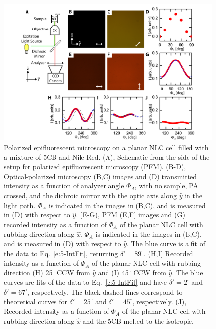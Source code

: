 \begin{figure}
  \centering
  \includegraphics{figures/C5/Ch5-Figs_PFM_FlatCell.png}
  \caption{Polarized epifluorescent microscopy on a planar NLC cell filled with a mixture of 5CB and Nile Red.
  (A), Schematic from the side of the setup for polarized epifluorescent microscopy (PFM).
  (B-D), Optical-polarized microscopy (B,C) images and (D) transmitted intensity as a function of analyzer angle $\Phi_A$, with no sample, PA crossed, and the dichroic mirror with the optic axis along $\hat{y}$ in the light path.
  $\Phi_A$ is indicated in the images in (B,C), and is measured in (D) with respect to $\hat{y}$.
  (E-G), PFM (E,F) images and (G) recorded intensity as a function of $\Phi_A$ of the planar NLC cell with rubbing direction along $\hat{x}$.
  $\Phi_A$ is indicated in the images in (B,C), and is measured in (D) with respect to $\hat{y}$.
  The blue curve is a fit of the data to Eq.~\ref{e:5-IntFit}, returning $\delta' = 89^{\circ}$.
  (H,I) Recorded intensity as a function of $\Phi_A$ of the planar NLC cell with rubbing direction (H) 25$^{\circ}$ CCW from $\hat{y}$ and (I) 45$^{\circ}$ CCW from $\hat{y}$.
  The blue curves are fits of the data to Eq.~\ref{e:5-IntFit} and have $\delta' = 2^{\circ}$ and $\delta' = 67^{\circ}$, respectively.
  The black dashed lines correspond to theoretical curves for $\delta' = 25^{\circ}$ and $\delta' = 45^{\circ}$, respectively.
  (J), Recorded intensity as a function of $\Phi_A$ of the planar NLC cell with rubbing direction along $\hat{x}$ and the 5CB melted to the isotropic.}\label{f:5-PFM_FlatCell}
\end{figure}

